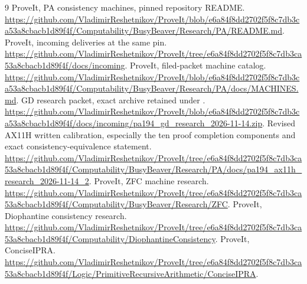 \documentclass[11pt,letterpaper]{article}
\newcommand{\file}[1]{\path{#1}}
\begin{document}
\clearpage
\begin{thebibliography}{9}
 ProveIt, PA consistency machines, pinned repository README.
\url{https://github.com/VladimirReshetnikov/ProveIt/blob/e6a84f8dd2702f5f8c7db3ca53a8cbacb1d89f4f/Computability/BusyBeaver/Research/PA/README.md}.
 ProveIt, incoming deliveries at the same pin.
\url{https://github.com/VladimirReshetnikov/ProveIt/tree/e6a84f8dd2702f5f8c7db3ca53a8cbacb1d89f4f/docs/incoming}.
 ProveIt, filed-packet machine catalog.
\url{https://github.com/VladimirReshetnikov/ProveIt/blob/e6a84f8dd2702f5f8c7db3ca53a8cbacb1d89f4f/Computability/BusyBeaver/Research/PA/docs/MACHINES.md}.
 GD research packet, exact archive retained under \file{references/}.
\url{https://github.com/VladimirReshetnikov/ProveIt/blob/e6a84f8dd2702f5f8c7db3ca53a8cbacb1d89f4f/docs/incoming/pa194_gd_research_2026-11-14.zip}.
 Revised AX11H written calibration, especially the ten proof
completion components and exact consistency-equivalence statement.
\url{https://github.com/VladimirReshetnikov/ProveIt/tree/e6a84f8dd2702f5f8c7db3ca53a8cbacb1d89f4f/Computability/BusyBeaver/Research/PA/docs/pa194_ax11h_research_2026-11-14_2}.
 ProveIt, ZFC machine research.
\url{https://github.com/VladimirReshetnikov/ProveIt/tree/e6a84f8dd2702f5f8c7db3ca53a8cbacb1d89f4f/Computability/BusyBeaver/Research/ZFC}.
 ProveIt, Diophantine consistency research.
\url{https://github.com/VladimirReshetnikov/ProveIt/tree/e6a84f8dd2702f5f8c7db3ca53a8cbacb1d89f4f/Computability/DiophantineConsistency}.
 ProveIt, ConciseIPRA.
\url{https://github.com/VladimirReshetnikov/ProveIt/tree/e6a84f8dd2702f5f8c7db3ca53a8cbacb1d89f4f/Logic/PrimitiveRecursiveArithmetic/ConciseIPRA}.
\end{thebibliography}
\end{document}
